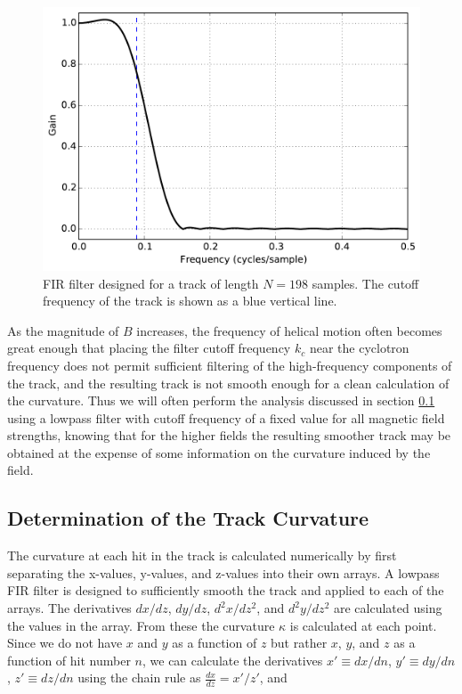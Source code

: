 \documentclass{JINST}
\begin{document}
\begin{figure}[!htb]
	\centering
	\includegraphics[scale=0.48]{fig/FIR_freq_resp_nmagse2_6.pdf}
	\caption{\label{fig_FIR}FIR filter designed for a track of length $N = 198$ samples.  The cutoff frequency of the track is shown as a blue vertical line.}
\end{figure}

As the magnitude of $B$ increases, the frequency of helical motion often becomes great enough that placing the filter
cutoff frequency $k_{c}$ near the cyclotron frequency does not permit sufficient filtering of the high-frequency
components of the track, and the resulting track is not smooth enough for a clean calculation of the curvature.
Thus we will often perform the analysis discussed in section \ref{ssec:curvature} using a lowpass filter with 
cutoff frequency of a fixed value for all magnetic field strengths, knowing that for the higher fields the resulting 
smoother track may be obtained at the expense of some information on the curvature induced by the field.

\subsection{Determination of the Track Curvature}\label{ssec:curvature}
The curvature at each hit in the track is calculated numerically by first separating the x-values, y-values, and z-values into their own arrays.  A lowpass FIR filter is designed to sufficiently smooth the track and applied to each of the arrays.  The derivatives $dx/dz$, $dy/dz$, $d^2x/dz^2$, and $d^2y/dz^2$ are calculated using the values in the array.  From these the curvature $\kappa$ is calculated at each point.  Since we do not have $x$ and $y$ as a function of $z$ but rather $x$, $y$, and $z$ as a function of hit number $n$, we can calculate the derivatives $x' \equiv dx/dn$, $y' \equiv dy/dn$, $z' \equiv dz/dn$ using the chain rule as $\frac{dx}{dz} = x'/z'$, and
\end{document}
